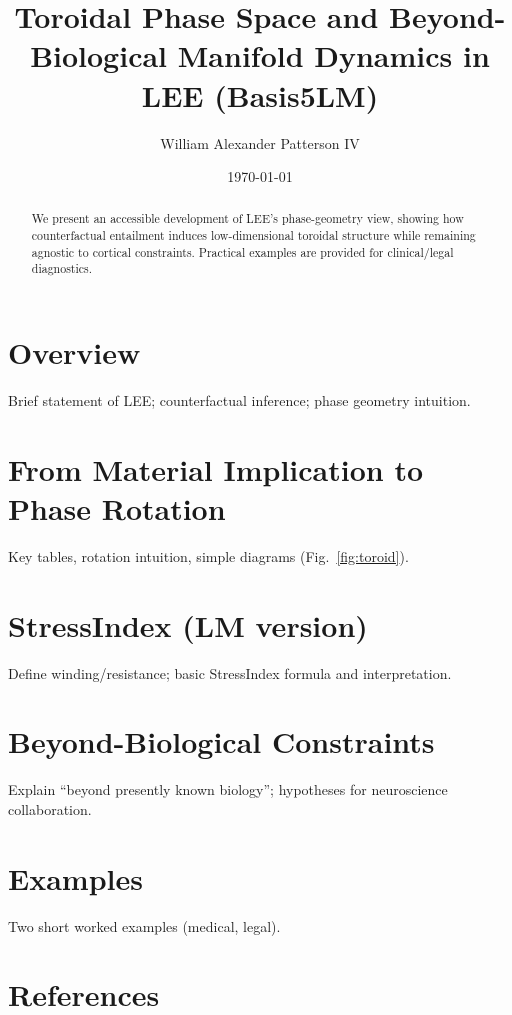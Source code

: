 \documentclass[11pt]{article}
\title{Toroidal Phase Space and Beyond-Biological Manifold Dynamics in LEE (Basis5LM)}
\author{William Alexander Patterson IV}
\date{\today}
\begin{document}
	\maketitle
	
	\begin{abstract}
		We present an accessible development of LEE’s phase-geometry view, showing how counterfactual entailment induces low-dimensional toroidal structure while remaining agnostic to cortical constraints. Practical examples are provided for clinical/legal diagnostics.
	\end{abstract}
	
	\section{Overview}
	Brief statement of LEE; counterfactual inference; phase geometry intuition.
	
	\section{From Material Implication to Phase Rotation}
	Key tables, rotation intuition, simple diagrams (Fig.~\ref{fig:toroid}).
	
	\section{StressIndex (LM version)}
	Define winding/resistance; basic StressIndex formula and interpretation.
	
	\section{Beyond-Biological Constraints}
	Explain “beyond presently known biology”; hypotheses for neuroscience collaboration.
	
	\section{Examples}
	Two short worked examples (medical, legal).
	
	\section{References}
	
	
\end{document}
